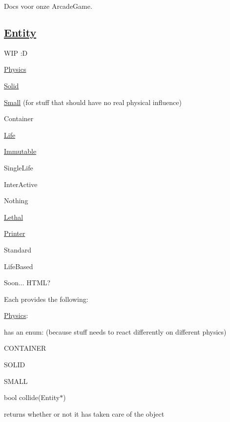Docs voor onze Arcade\-Game.

\subsection*{\hyperlink{class_entity}{Entity}}

W\-I\-P \-:D


\begin{DoxyItemize}
\item \hyperlink{class_physics}{Physics}
\begin{DoxyItemize}
\item \hyperlink{class_solid}{Solid}
\item \hyperlink{class_small}{Small} (for stuff that should have no real physical influence)
\item Container
\end{DoxyItemize}
\item \hyperlink{class_life}{Life}
\begin{DoxyItemize}
\item \hyperlink{class_immutable}{Immutable}
\item Single\-Life
\end{DoxyItemize}
\item Inter\-Active
\begin{DoxyItemize}
\item Nothing
\item \hyperlink{class_lethal}{Lethal}
\end{DoxyItemize}
\item \hyperlink{class_printer}{Printer}
\begin{DoxyItemize}
\item Standard
\item Life\-Based
\end{DoxyItemize}
\item Soon... H\-T\-M\-L?
\end{DoxyItemize}

Each provides the following\-:
\begin{DoxyItemize}
\item \hyperlink{class_physics}{Physics}\-:
\begin{DoxyItemize}
\item has an enum\-: (because stuff needs to react differently on different physics)
\begin{DoxyItemize}
\item C\-O\-N\-T\-A\-I\-N\-E\-R
\item S\-O\-L\-I\-D
\item S\-M\-A\-L\-L
\end{DoxyItemize}
\item bool collide(\-Entity$\ast$)
\begin{DoxyItemize}
\item returns whether or not it has taken care of the object
\end{DoxyItemize}
\item 
\end{DoxyItemize}
\end{DoxyItemize}